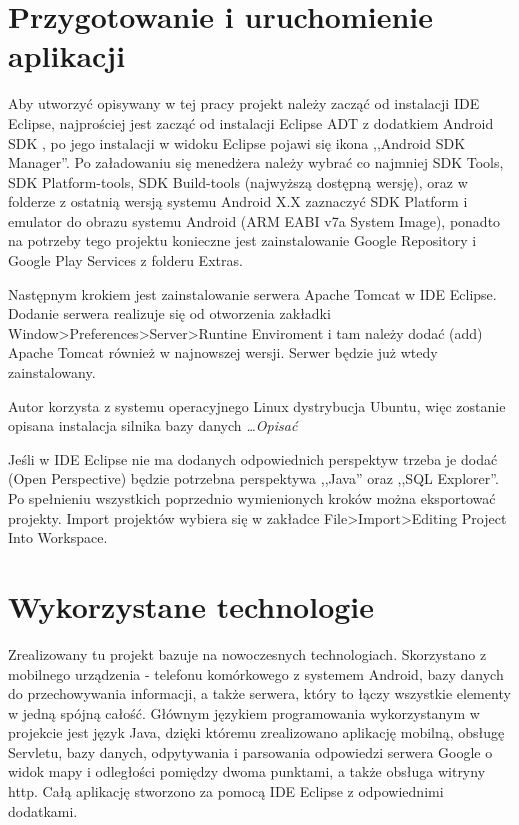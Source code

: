 \documentclass[eng,printmode,oneside]{mgr}
\begin{document}
\chapter{Przygotowanie i uruchomienie aplikacji}

Aby utworzyć opisywany w tej pracy projekt należy zacząć od instalacji IDE
Eclipse,  najprościej jest zacząć od instalacji Eclipse ADT z dodatkiem Android
SDK \cite{eclipse}, po jego instalacji w widoku Eclipse pojawi się ikona
,,Android SDK Manager''. Po załadowaniu się menedżera należy wybrać co najmniej
SDK Tools, SDK Platform-tools, SDK Build-tools (najwyższą dostępną wersję), oraz w
folderze z ostatnią wersją systemu Android X.X zaznaczyć SDK Platform i
emulator do obrazu systemu Android (ARM EABI v7a System Image), ponadto na
potrzeby tego projektu konieczne jest zainstalowanie Google Repository i Google
Play Services z folderu Extras.

Następnym krokiem jest zainstalowanie serwera Apache Tomcat w IDE Eclipse.
Dodanie serwera realizuje się od otworzenia zakładki
Window>Preferences>Server>Runtine Enviroment i tam należy dodać (add) Apache
Tomcat również w najnowszej wersji. Serwer będzie już wtedy zainstalowany. 

Autor korzysta z systemu operacyjnego Linux dystrybucja Ubuntu, więc zostanie
opisana instalacja silnika bazy danych \emph{\color{komentarz}\ldots Opisać}

Jeśli w IDE Eclipse nie ma dodanych odpowiednich perspektyw trzeba je dodać
(Open Perspective) będzie potrzebna perspektywa ,,Java'' oraz ,,SQL Explorer''.
Po spełnieniu wszystkich poprzednio wymienionych kroków można eksportować
projekty. Import projektów wybiera się w zakładce File>Import>Editing Project
Into Workspace.

\chapter{Wykorzystane technologie}

Zrealizowany tu projekt bazuje na nowoczesnych technologiach.
Skorzystano z mobilnego urządzenia - telefonu komórkowego z systemem
Android, bazy danych do przechowywania informacji, a także serwera, który to
łączy wszystkie elementy w jedną spójną całość. Głównym językiem
programowania wykorzystanym w projekcie jest język Java, dzięki któremu
zrealizowano aplikację mobilną, obsługę Servletu, bazy danych, odpytywania i
parsowania odpowiedzi serwera Google o widok mapy i odległości pomiędzy dwoma
punktami, a także obsługa witryny http. Całą aplikację stworzono za pomocą IDE
Eclipse z odpowiednimi dodatkami.
\end{document}
